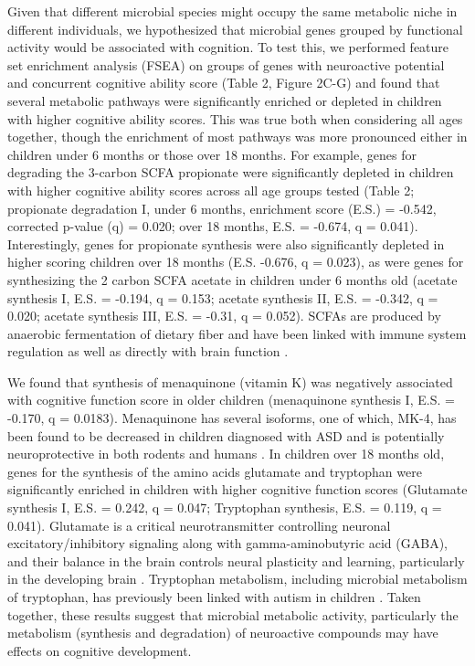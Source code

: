 \documentclass{article}
\begin{document}
Given that different microbial species might occupy the same metabolic
niche in different individuals, we hypothesized that microbial genes
grouped by functional activity would be associated with cognition. To
test this, we performed feature set enrichment analysis (FSEA) on groups
of genes with neuroactive potential
\cite{valles-colomerNeuroactivePotentialHuman2019}
and concurrent cognitive ability score (Table 2, Figure 2C-G) and found that
several metabolic pathways were significantly enriched or depleted in
children with higher cognitive ability scores. This was true both when
considering all ages together, though the enrichment of most
pathways was more pronounced either in children under 6 months or those over 18
months. For example, genes for degrading the 3-carbon SCFA propionate
were significantly depleted in children with higher cognitive ability
scores across all age groups tested (Table 2; propionate degradation I,
under 6 months, enrichment score (E.S.) = -0.542, corrected p-value (q)
= 0.020; over 18 months, E.S. = -0.674, q = 0.041). Interestingly, genes
for propionate synthesis were also significantly depleted in higher
scoring children over 18 months (E.S. -0.676, q = 0.023), as were genes
for synthesizing the 2 carbon SCFA acetate in children under 6 months
old (acetate synthesis I, E.S. = -0.194, q = 0.153; acetate synthesis
II, E.S. = -0.342, q = 0.020; acetate synthesis III, E.S. = -0.31, q = 0.052).
SCFAs are produced by anaerobic fermentation of dietary fiber
and have been linked with immune system regulation as well as directly
with brain function \cite{dalileRoleShortchainFatty2019}.

We found that synthesis of menaquinone (vitamin K) was negatively associated with
cognitive function score in older children (menaquinone synthesis I,
E.S. = -0.170, q = 0.0183). Menaquinone has several isoforms, one of
which, MK-4, has been found to be decreased in children diagnosed with ASD
\cite{dongCorrelationSerumConcentrations2021}
and is potentially neuroprotective in both rodents and humans
\cite{elkattawyVitaminK2Menaquinone72022}.
In children over 18 months old,
genes for the synthesis of the amino acids
glutamate and tryptophan were significantly enriched in children with
higher cognitive function scores (Glutamate synthesis I, E.S. = 0.242, q
= 0.047; Tryptophan synthesis, E.S. = 0.119, q = 0.041). Glutamate is a
critical neurotransmitter controlling neuronal excitatory/inhibitory
signaling along with gamma-aminobutyric acid (GABA), and their balance
in the brain controls neural plasticity and learning, particularly in
the developing brain
\cite{cohenkadoshLinkingGABAGlutamate2015,palomo-buitragoGlutamateInteractionsObesity2019}.
Tryptophan metabolism, including
microbial metabolism of tryptophan, has previously been linked with
autism in children
\cite{hoshinoBloodSerotoninFree1984,xiaoFecalMicrobiomeTransplantation2021}.
Taken together, these results suggest that
microbial metabolic activity, particularly the metabolism (synthesis and
degradation) of neuroactive compounds may have effects on cognitive
development.
\end{document}
